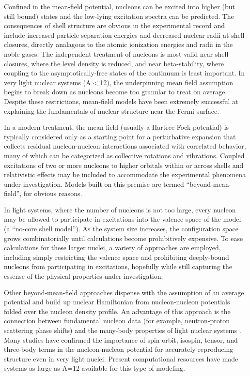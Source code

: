 Confined in the mean-field potential, nucleons can be
excited into higher (but still bound) states and the low-lying excitation
spectra can be predicted. The consequences of shell structure are obvious
in the experimental record and include increased particle separation 
energies and decreased nuclear radii at shell closures, directly analagous to
the atomic ionization energies and radii in the noble gases. The independent
treatment of nucleons is most valid near shell closures,
where the level density is reduced, and near beta-stability, where coupling to
the asymptotically-free states of the continuum is least important. In very light nuclear
systems (A$<$12), the underpinning mean field assumption begins to break down as
nucleons become too granular to treat on average. Despite these restrictions, mean-field models have
been extremely successful at explaining the fundamentals of nuclear structure near the Fermi
surface.

In a modern treatment, the mean field (usually a Hartree-Fock potential)
is typically considered only as a starting point for a perturbative
expansion that collects residual nucleon-nucleon interactions associated with
correlated behavior, many of which can be categorized as collective rotations
and vibrations. Coupled excitations of
two or more nucleons to higher orbitals within or across shells and relativistic effects may 
be included to accommodate the experimental phenomena under investigation.
Models built on this premise are termed ``beyond-mean-field'', for obvious reasons.

In light systems, where the number of nucleons is not too large, every nucleon
may be allowed to participate in excitations into the valence space of the model
(a ``no-core shell model''). As the system size increases, the configuration space grows
combinatorially until calculations become prohibitively expensive. To ease calculations for these 
larger nuclei, a variety of approaches
are employed, including simply restricting the valence space and prohibiting deeply-bound 
nucleons from participating in excitations, hopefully while still capturing the
essense of the physical properties under investigation.


Other beyond-mean-field approaches dispense with the assumption of an average
potential and build up nuclear Hamiltonian from nucleon-nucleon potentials
folded over the nucleon density profile. An advantage
of this approach is the connection between fundamental nucleon data
(for example, neutron-proton scattering phase shifts) and the many-body
properties of light nuclear systems \cite{AV18}. Many studies have
confirmed the importance of spin-orbit, isospin, tensor, and three-body terms
in the nucleon-nucleon potential for accurately reproducing structure even in
very light nuclei. Present computational resources have made systems as large as A=12 available for
this type of modeling.

